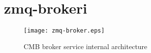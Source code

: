 \section{zmq-brokeri}

\begin{figure}
\centering
\texttt{[image: zmq-broker.eps]}
\caption{CMB broker service internal architecture}
\label{fig:cmbinternal}
\end{figure}

